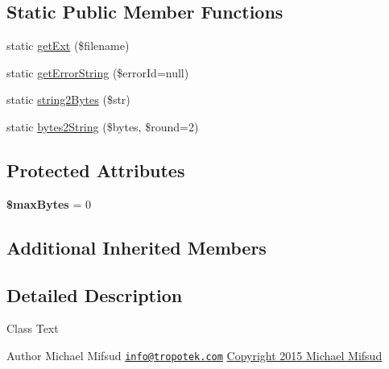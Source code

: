 \subsection*{Static Public Member Functions}
\begin{DoxyCompactItemize}
\item 
static \hyperlink{classTk_1_1Form_1_1Field_1_1File_a0ac694bd65836bc584533579364410b3}{get\+Ext} (\$filename)
\item 
static \hyperlink{classTk_1_1Form_1_1Field_1_1File_a94fda7e0599b8bda3cfc05023244c19b}{get\+Error\+String} (\$error\+Id=null)
\item 
static \hyperlink{classTk_1_1Form_1_1Field_1_1File_aeb0ac3abb4651253f31e06c0093b268c}{string2\+Bytes} (\$str)
\item 
static \hyperlink{classTk_1_1Form_1_1Field_1_1File_aadfdba00a25ea2df6d2c7568d15a8683}{bytes2\+String} (\$bytes, \$round=2)
\end{DoxyCompactItemize}
\subsection*{Protected Attributes}
\begin{DoxyCompactItemize}
\item 
\hypertarget{classTk_1_1Form_1_1Field_1_1File_a01371de48b4145e9fd6c9022a0683ee2}{{\bfseries \$max\+Bytes} = 0}\label{classTk_1_1Form_1_1Field_1_1File_a01371de48b4145e9fd6c9022a0683ee2}

\end{DoxyCompactItemize}
\subsection*{Additional Inherited Members}


\subsection{Detailed Description}
Class Text

\begin{DoxyAuthor}{Author}
Michael Mifsud \href{mailto:info@tropotek.com}{\tt info@tropotek.\+com} \hyperlink{}{Copyright 2015 Michael Mifsud }
\end{DoxyAuthor}


